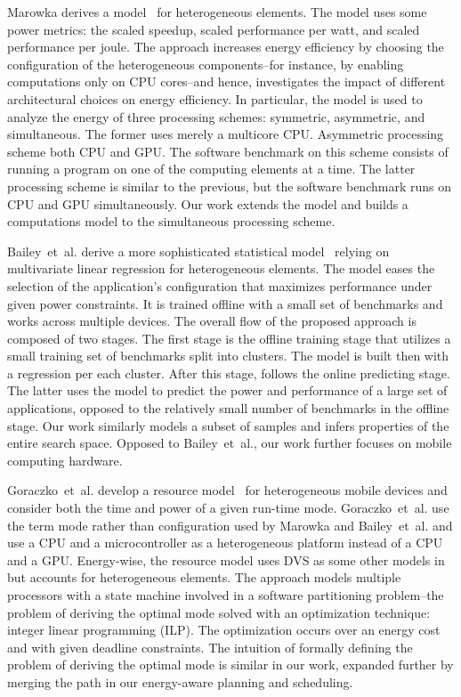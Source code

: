 Marowka derives a model~\citep{marowka2017energy} for heterogeneous elements. The model uses some power metrics: the scaled speedup, scaled performance per watt, and scaled performance per joule. The approach increases energy efficiency by choosing the configuration of the heterogeneous components--for instance, by enabling computations only on CPU cores--and hence, investigates the impact of different architectural choices on energy efficiency. In particular, the model is used to analyze the energy of three processing schemes: symmetric, asymmetric, and simultaneous. The former uses merely a multicore CPU. Asymmetric processing scheme both CPU and GPU. The software benchmark on this scheme consists of running a program on one of the computing elements at a time. The latter processing scheme is similar to the previous, but the software benchmark runs on CPU and GPU simultaneously. Our work extends the model and builds a computations model to the simultaneous processing scheme.

Bailey~et~al. derive a more sophisticated statistical model~\citep{bailey2014adaptive} relying on multivariate linear regression for heterogeneous elements. The model eases the selection of the application's configuration that maximizes performance under given power constraints. It is trained offline with a small set of benchmarks and works across multiple devices. The overall flow of the proposed approach is composed of two stages. The first stage is the offline training stage that utilizes a small training set of benchmarks split into clusters. The model is built then with a regression per each cluster. After this stage, follows the online predicting stage. The latter uses the model to predict the power and performance of a large set of applications, opposed to the relatively small number of benchmarks in the offline stage. Our work similarly models a subset of samples and infers properties of the entire search space. Opposed to Bailey~et~al., our work further focuses on mobile computing hardware.

Goraczko~et~al. develop a resource model~\citep{goraczko2008energy} for heterogeneous mobile devices and consider both the time and power of a given run-time mode. Goraczko~et~al. use the term mode rather than configuration used by Marowka and Bailey~et~al. and use a CPU and a microcontroller as a heterogeneous platform instead of a CPU and a GPU. Energy-wise, the resource model uses DVS as some other models in  but accounts for heterogeneous elements. The approach models multiple processors with a state machine involved in a software partitioning problem--the problem of deriving the optimal mode solved with an optimization technique: integer linear programming (ILP). The optimization occurs over an energy cost and with given deadline constraints. The intuition of formally defining the problem of deriving the optimal mode is similar in our work, expanded further by merging the path in our energy-aware planning and scheduling.

